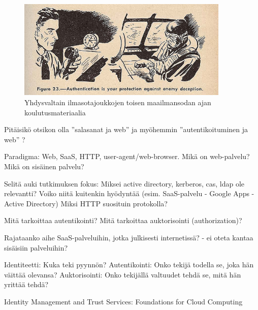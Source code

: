 \documentclass[finnish,gradu]{tktltiki}
\begin{document}
  \begin{figure}
    \centering
    \includegraphics[width=0.9\textwidth]{images/usnavy_authentication.jpg}
    \caption{Yhdysvaltain ilmasotajoukkojen toisen maailmansodan ajan koulutusmateriaalia~\cite{usnavy_authentication}}
    \label{fig:yleiskuva}
  \end{figure}


  Pitäisikö otsikon olla ''salasanat ja web'' ja myöhemmin ''autentikoituminen ja web'' ?

  Paradigma: Web, SaaS, HTTP, user-agent/web-browser.
  Mikä on web-palvelu?
  Mikä on sisäinen palvelu?

  Selitä auki tutkimuksen fokus:
  Miksei active directory, kerberos, cas, ldap ole relevantti?
  Voiko niitä kuitenkin hyödyntää (esim. SaaS-palvelu - Google Apps - Active Directory)
  Miksi HTTP suosituin protokolla?

  Mitä tarkoittaa autentikointi?
  Mitä tarkoittaa auktorisointi (authorization)?

  Rajataanko aihe SaaS-palveluihin, jotka julkisesti internetissä?
  - ei oteta kantaa sisäisiin palveluihin?

  Identiteetti: Kuka teki pyynnön?
  Autentikointi: Onko tekijä todella se, joka hän väittää olevansa?
  Auktorisointi: Onko tekijällä valtuudet tehdä se, mitä hän yrittää tehdä?

  Identity Management and Trust Services: Foundations for Cloud Computing
\end{document}
